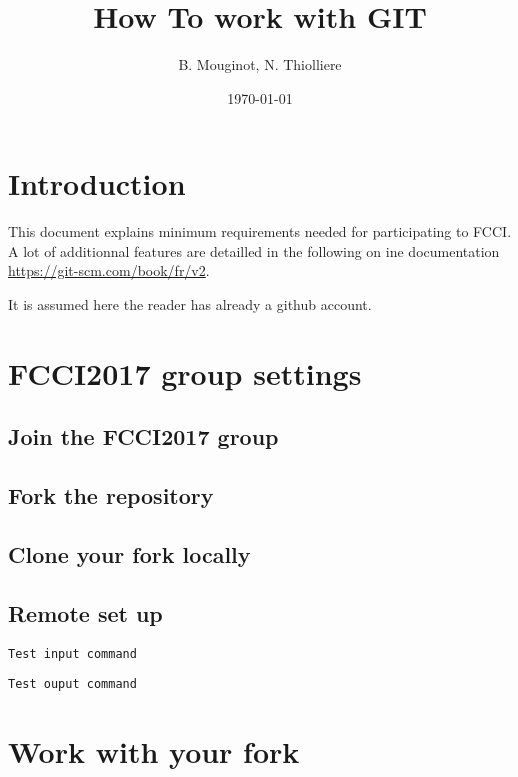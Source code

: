 \documentclass[a4paper,11pt]{article}
\title{How To work with GIT}
\date{\today}
\author{B. Mouginot, N. Thiolliere}
\begin{document}
\maketitle
{}

\tableofcontents

\section{Introduction}

	This document explains minimum requirements needed for participating to FCCI. A lot of additionnal features are detailled in the following on ine documentation \url{https://git-scm.com/book/fr/v2}.

	It is assumed here the reader has already a github account.

\section{FCCI2017 group settings}

	\subsection{Join the FCCI2017 group}

	\subsection{Fork the repository}

	\subsection{Clone your fork locally}

	\subsection{Remote set up}

	\begin{lstlisting}[style=BashInputStyle]
	Test input command
	\end{lstlisting}
	\bigskip

	\begin{lstlisting}[style=BashOutputStyle]
	Test ouput command
	\end{lstlisting}
	\bigskip

\section{Work with your fork}
\end{document}
